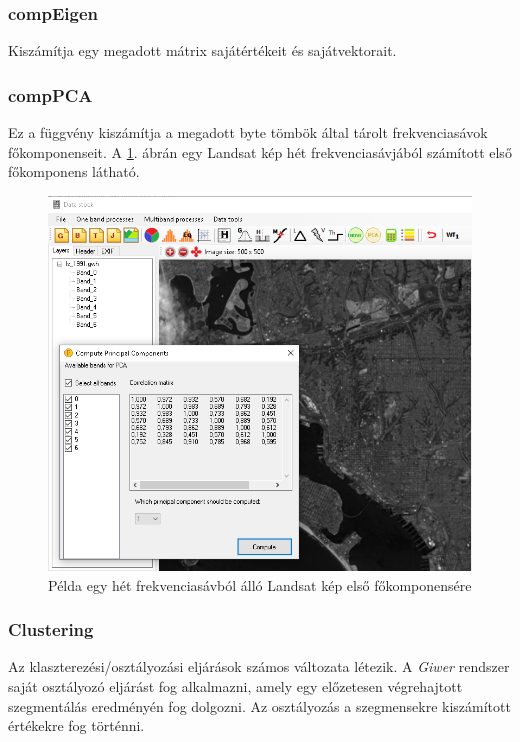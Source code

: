 \documentclass[a4paper,12pt]{article}
\begin{document}
\subsubsection{compEigen}

Kiszámítja egy megadott mátrix sajátértékeit és sajátvektorait.

\subsubsection{compPCA}

Ez a függvény kiszámítja a megadott byte tömbök által tárolt frekvenciasávok főkomponenseit. A \ref{fig:pca_landsat}. ábrán egy Landsat kép hét frekvenciasávjából számított első főkomponens látható.

\begin{figure}
	\centering
	\includegraphics[width=12cm]{pca_landsat.png}
	\caption{Példa egy hét frekvenciasávból álló Landsat kép első főkomponensére}
	\label{fig:pca_landsat}
\end{figure}

\subsubsection{Clustering}

Az klaszterezési/osztályozási eljárások számos változata létezik. A \textit{Giwer} rendszer saját osztályozó eljárást fog alkalmazni, amely egy előzetesen végrehajtott szegmentálás eredményén fog dolgozni. Az osztályozás a szegmensekre kiszámított értékekre fog történni.
\end{document}
